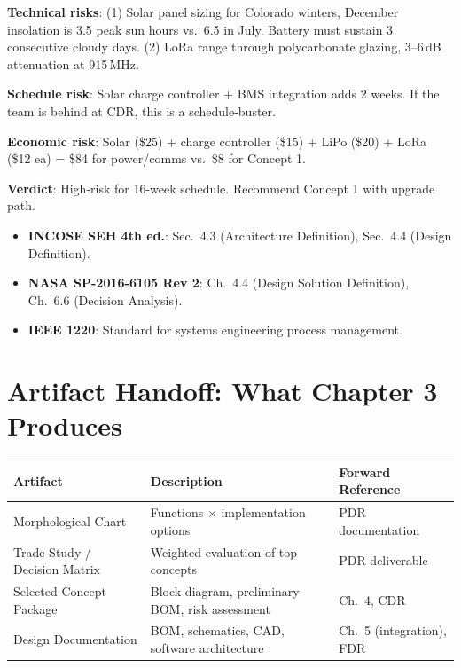 \documentclass[11pt,letterpaper,twoside,openany]{book}
\begin{document}
\begin{greenshieldbox}
\textbf{Technical risks}: (1) Solar panel sizing for Colorado winters, December insolation is 3.5 peak sun hours vs.\ 6.5 in July. Battery must sustain 3 consecutive cloudy days. (2) LoRa range through polycarbonate glazing, 3--6\,dB attenuation at 915\,MHz.

\textbf{Schedule risk}: Solar charge controller + BMS integration adds 2 weeks. If the team is behind at CDR, this is a schedule-buster.

\textbf{Economic risk}: Solar (\$25) + charge controller (\$15) + LiPo (\$20) + LoRa (\$12 ea) = \$84 for power/comms vs.\ \$8 for Concept 1.

\textbf{Verdict}: High-risk for 16-week schedule. Recommend Concept 1 with upgrade path.
\end{greenshieldbox}

\begin{keyconceptbox}
\begin{itemize}[nosep,leftmargin=1.5em]
\item \textbf{INCOSE SEH 4th ed.}: Sec.\ 4.3 (Architecture Definition), Sec.\ 4.4 (Design Definition).
\item \textbf{NASA SP-2016-6105 Rev 2}: Ch.\ 4.4 (Design Solution Definition), Ch.\ 6.6 (Decision Analysis).
\item \textbf{IEEE 1220}: Standard for systems engineering process management.
\end{itemize}
\end{keyconceptbox}

\section{Artifact Handoff: What Chapter 3 Produces}
\begin{table}[htbp]\centering\small
\begin{tabularx}{\textwidth}{l X l}
\toprule
\textbf{Artifact} & \textbf{Description} & \textbf{Forward Reference} \\
\midrule
Morphological Chart & Functions $\times$ implementation options & PDR documentation \\
Trade Study / Decision Matrix & Weighted evaluation of top concepts & PDR deliverable \\
Selected Concept Package & Block diagram, preliminary BOM, risk assessment & Ch.~4, CDR \\
Design Documentation & BOM, schematics, CAD, software architecture & Ch.~5 (integration), FDR \\
\bottomrule
\end{tabularx}
\end{table}
\end{document}
